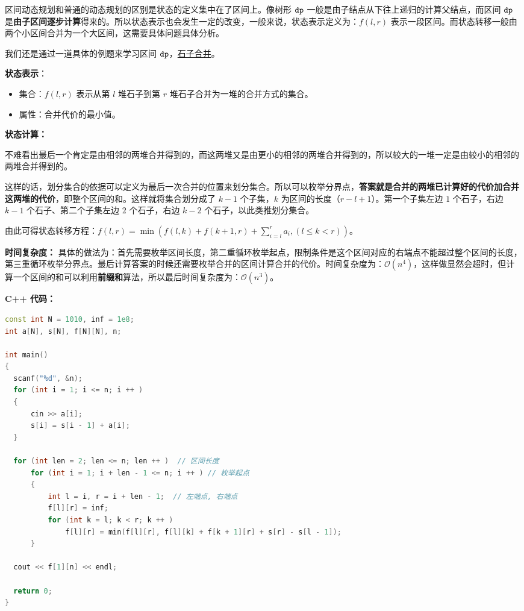 
区间动态规划和普通的动态规划的区别是状态的定义集中在了区间上。像树形 $\tt dp$ 一般是由子结点从下往上递归的计算父结点，而区间 $\tt dp$ 是\textbf{由子区间逐步计算}得来的。所以状态表示也会发生一定的改变，一般来说，状态表示定义为：$f(l, r)$ 表示一段区间。而状态转移一般由两个小区间合并为一个大区间，这需要具体问题具体分析。

我们还是通过一道具体的例题来学习区间 $\tt dp$，\href{https://www.luogu.com.cn/problem/P1775}{石子合并}。

\textbf{状态表示}：
\begin{itemize}
\item 集合：$f(l, r)$ 表示从第 $l$ 堆石子到第 $r$ 堆石子合并为一堆的合并方式的集合。
\item 属性：合并代价的最小值。
\end{itemize}

\textbf{状态计算：}

不难看出最后一个肯定是由相邻的两堆合并得到的，而这两堆又是由更小的相邻的两堆合并得到的，所以较大的一堆一定是由较小的相邻的两堆合并得到的。

这样的话，划分集合的依据可以定义为最后一次合并的位置来划分集合。所以可以枚举分界点，\textbf{答案就是合并的两堆已计算好的代价加合并这两堆的代价}，即整个区间的和。这样就将集合划分成了 $k - 1$ 个子集，$k$ 为区间的长度（$r - l + 1$）。第一个子集左边 $1$ 个石子，右边 $k - 1$ 个石子、第二个子集左边 $2$ 个石子，右边 $k - 2$ 个石子，以此类推划分集合。

由此可得状态转移方程：$f(l, r) = \min(f(l, k) + f(k + 1, r) + \sum^{r}_{i = l}a_i, (l \leq k < r))$。

\textbf{时间复杂度：} 具体的做法为：首先需要枚举区间长度，第二重循环枚举起点，限制条件是这个区间对应的右端点不能超过整个区间的长度，第三重循环枚举分界点。最后计算答案的时候还需要枚举合并的区间计算合并的代价。时间复杂度为：$\mathcal{O}(n^4)$，这样做显然会超时，但计算一个区间的和可以利用\textbf{前缀和}算法，所以最后时间复杂度为：$\mathcal{O}(n^3)$。

\textbf{C++ 代码：}

\begin{lstlisting}[language=cpp]
const int N = 1010, inf = 1e8;
int a[N], s[N], f[N][N], n;

int main()
{
  scanf("%d", &n);
  for (int i = 1; i <= n; i ++ ) 
  {
      cin >> a[i];
      s[i] = s[i - 1] + a[i];
  }

  for (int len = 2; len <= n; len ++ )  // 区间长度
      for (int i = 1; i + len - 1 <= n; i ++ ) // 枚举起点
      {
          int l = i, r = i + len - 1;  // 左端点, 右端点
          f[l][r] = inf;
          for (int k = l; k < r; k ++ )
              f[l][r] = min(f[l][r], f[l][k] + f[k + 1][r] + s[r] - s[l - 1]);
      }

  cout << f[1][n] << endl;

  return 0;
}
\end{lstlisting}